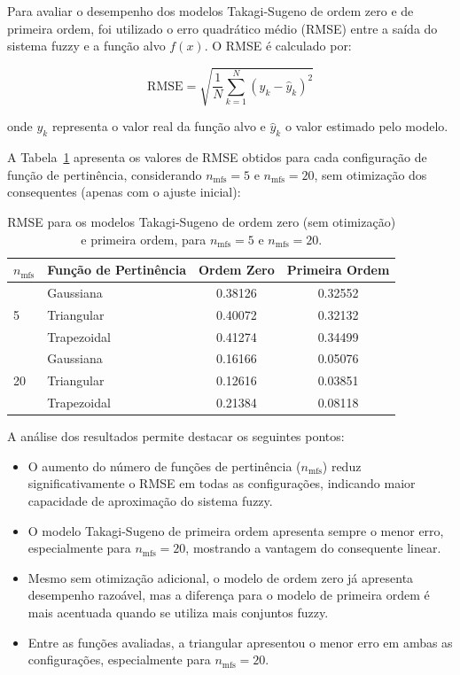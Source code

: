 Para avaliar o desempenho dos modelos Takagi-Sugeno de ordem zero e de primeira ordem, foi utilizado o erro quadrático médio (RMSE) entre a saída do sistema fuzzy e a função alvo $f(x)$. O RMSE é calculado por:

\[
\mathrm{RMSE} = \sqrt{\frac{1}{N} \sum_{k=1}^{N} \left( y_k - \hat{y}_k \right)^2}
\]

onde $y_k$ representa o valor real da função alvo e $\hat{y}_k$ o valor estimado pelo modelo.

A Tabela~\ref{tab:rmse_sem_otimizacao} apresenta os valores de RMSE obtidos para cada configuração de função de pertinência, considerando $n_\text{mfs}=5$ e $n_\text{mfs}=20$, sem otimização dos consequentes (apenas com o ajuste inicial):

\begin{table}[H]
    \centering
    \caption{RMSE para os modelos Takagi-Sugeno de ordem zero (sem otimização) e primeira ordem, para $n_\text{mfs}=5$ e $n_\text{mfs}=20$.}
    \label{tab:rmse_sem_otimizacao}
    \begin{tabular}{llcc}
        \toprule
        \textbf{$n_\text{mfs}$} & \textbf{Função de Pertinência} & \textbf{Ordem Zero} & \textbf{Primeira Ordem} \\
        \midrule
        \multirow{3}{*}{5}  & Gaussiana   & 0.38126 & 0.32552 \\
                            & Triangular  & 0.40072 & 0.32132 \\
                            & Trapezoidal & 0.41274 & 0.34499 \\
        \midrule
        \multirow{3}{*}{20} & Gaussiana   & 0.16166 & 0.05076 \\
                            & Triangular  & 0.12616 & 0.03851 \\
                            & Trapezoidal & 0.21384 & 0.08118 \\
        \bottomrule
    \end{tabular}
\end{table}

A análise dos resultados permite destacar os seguintes pontos:

\begin{itemize}
    \item O aumento do número de funções de pertinência ($n_\text{mfs}$) reduz significativamente o RMSE em todas as configurações, indicando maior capacidade de aproximação do sistema fuzzy.
    \item O modelo Takagi-Sugeno de primeira ordem apresenta sempre o menor erro, especialmente para $n_\text{mfs}=20$, mostrando a vantagem do consequente linear.
    \item Mesmo sem otimização adicional, o modelo de ordem zero já apresenta desempenho razoável, mas a diferença para o modelo de primeira ordem é mais acentuada quando se utiliza mais conjuntos fuzzy.
    \item Entre as funções avaliadas, a triangular apresentou o menor erro em ambas as configurações, especialmente para $n_\text{mfs}=20$.
\end{itemize}

